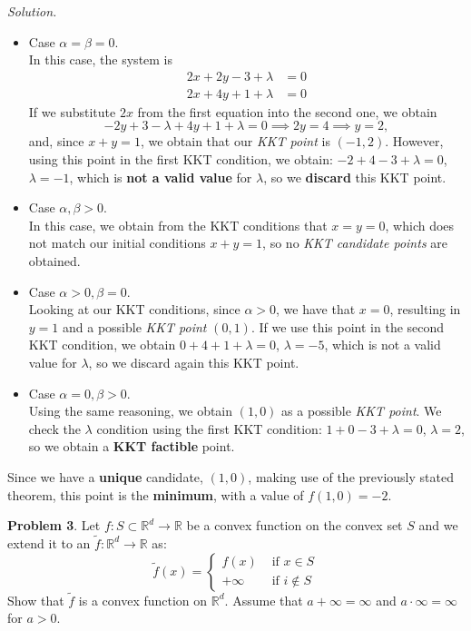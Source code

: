 \documentclass[a4paper]{article}
\newenvironment{problem}[2][Problem]
    { \begin{mdframed}[backgroundcolor=gray!20] \vspace*{0.1cm} \textbf{#1 #2}.}
    {  \end{mdframed}\vspace{0.3cm}}
\newenvironment{solution}
    {\textit{Solution.}\\}
    {}
\newcommand{\R}{\mathbb R}
\begin{document}
\begin{solution}
\begin{itemize}
  \item Case \(\alpha = \beta = 0\).\\
        In this case, the system is
        \begin{align*}
          2x + 2y - 3 + \lambda & = 0 \\
          2x + 4y +1 + \lambda & = 0
        \end{align*}
        If we substitute \(2x\) from the first equation into the second one, we obtain
        \[
          -2y +3 - \lambda +4y + 1 + \lambda = 0 \implies 2y = 4  \implies y = 2,
        \]
        and, since \(x+y = 1\), we obtain that our \emph{KKT point} is \((-1,2)\). However, using this point in the first KKT condition, we obtain: \(-2 + 4 - 3 + \lambda = 0\), \(\lambda = -1\), which is \textbf{not a valid value} for \(\lambda\), so we \textbf{discard} this KKT point.
  \item Case \(\alpha, \beta > 0\).\\
        In this case, we obtain from the KKT conditions that \(x=  y = 0\), which does not match our initial conditions \(x+y = 1\), so no \emph{KKT candidate points} are obtained.
  \item Case \(\alpha > 0, \beta = 0\).\\
        Looking at our KKT conditions, since \(\alpha > 0\), we have that \(x = 0\), resulting in \(y=1\) and a possible \emph{KKT point} \((0,1)\). If we use this point in the second KKT condition, we obtain \(0+4+1 + \lambda = 0\), \(\lambda = -5\), which is not a valid value for \(\lambda\), so we discard again this KKT point.
  \item Case \(\alpha = 0, \beta > 0\).\\
        Using the same reasoning, we obtain \((1,0)\) as a possible \emph{KKT point}. We check the \(\lambda\) condition using the first KKT condition: \(1 + 0 -3 + \lambda = 0\), \(\lambda = 2\), so we obtain a \textbf{KKT factible} point.
\end{itemize}

Since we have a \textbf{unique} candidate, \((1,0)\), making use of the previously stated theorem, this point is the \textbf{minimum}, with a value of \(f(1,0) = -2\).

\end{solution}

\begin{problem}{3}
Let \(f: S \subset \R^d \to \R\) be a convex function on the convex set \(S\) and we extend it to an \(\tilde f : \R^d \to \R\) as:
\[
\tilde f(x) = \begin{cases}
f(x) & \text{ if } x \in S\\
+\infty & \text{ if } i \notin S 
\end{cases}
\]
Show that \(\tilde f\) is a convex function on \(\R^d\). Assume that \(a+\infty = \infty\) and \(a\cdot \infty = \infty\) for \(a > 0\).
\end{problem}
\end{document}
